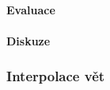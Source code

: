 \documentclass[11pt,a4paper]{report}
\begin{document}
\subsection{Evaluace}
\subsection{Diskuze}
\section{Interpolace vět}

{%
\pagestyle{plain}

}




\part*{\Prilohy\thispagestyle{empty}}
\appendix

% 
% 
\end{document}
